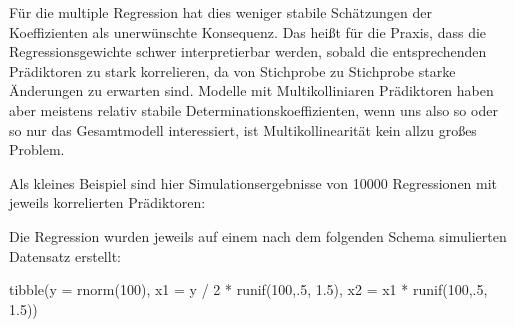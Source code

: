 \documentclass[
]{book}
\newenvironment{Shaded}{\begin{snugshade}}{\end{snugshade}}
\newcommand{\AttributeTok}[1]{\textcolor[rgb]{0.77,0.63,0.00}{#1}}
\newcommand{\DecValTok}[1]{\textcolor[rgb]{0.00,0.00,0.81}{#1}}
\newcommand{\FloatTok}[1]{\textcolor[rgb]{0.00,0.00,0.81}{#1}}
\newcommand{\FunctionTok}[1]{\textcolor[rgb]{0.00,0.00,0.00}{#1}}
\newcommand{\NormalTok}[1]{#1}
\newcommand{\SpecialCharTok}[1]{\textcolor[rgb]{0.00,0.00,0.00}{#1}}
\begin{document}
Für die multiple Regression hat dies weniger stabile Schätzungen der Koeffizienten als unerwünschte Konsequenz. Das heißt für die Praxis, dass die Regressionsgewichte schwer interpretierbar werden, sobald die entsprechenden Prädiktoren zu stark korrelieren, da von Stichprobe zu Stichprobe starke Änderungen zu erwarten sind. Modelle mit Multikolliniaren Prädiktoren haben aber meistens relativ stabile Determinationskoeffizienten, wenn uns also so oder so nur das Gesamtmodell interessiert, ist Multikollinearität kein allzu großes Problem.

Als kleines Beispiel sind hier Simulationsergebnisse von 10000 Regressionen mit jeweils korrelierten Prädiktoren:

Die Regression wurden jeweils auf einem nach dem folgenden Schema simulierten Datensatz erstellt:

\begin{Shaded}
\begin{Highlighting}[]
\FunctionTok{tibble}\NormalTok{(}\AttributeTok{y =} \FunctionTok{rnorm}\NormalTok{(}\DecValTok{100}\NormalTok{),}
       \AttributeTok{x1 =}\NormalTok{ y }\SpecialCharTok{/} \DecValTok{2} \SpecialCharTok{*} \FunctionTok{runif}\NormalTok{(}\DecValTok{100}\NormalTok{,.}\DecValTok{5}\NormalTok{, }\FloatTok{1.5}\NormalTok{),}
       \AttributeTok{x2 =}\NormalTok{ x1 }\SpecialCharTok{*} \FunctionTok{runif}\NormalTok{(}\DecValTok{100}\NormalTok{,.}\DecValTok{5}\NormalTok{, }\FloatTok{1.5}\NormalTok{)) }
\end{Highlighting}
\end{Shaded}

 
  \providecommand{\huxb}[2]{\arrayrulecolor[RGB]{#1}\global\arrayrulewidth=#2pt}
  \providecommand{\huxvb}[2]{\color[RGB]{#1}\vrule width #2pt}
  \providecommand{\huxtpad}[1]{\rule{0pt}{#1}}
  \providecommand{\huxbpad}[1]{\rule[-#1]{0pt}{#1}}
\end{document}
